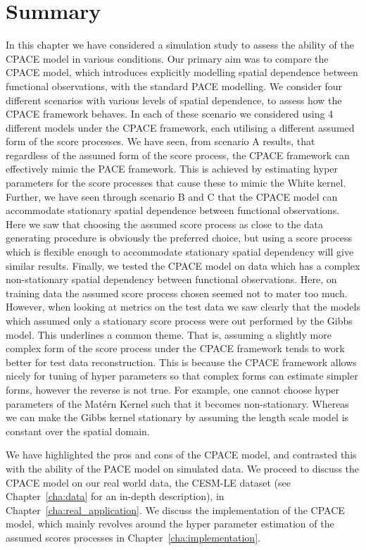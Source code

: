 \section{Summary\label{sec:sim_summ}}
In this chapter we have considered a simulation study to assess the ability of the CPACE model in various conditions.
Our primary aim was to compare the CPACE model, which introduces explicitly modelling spatial dependence between functional observations, with the standard PACE modelling.
We consider four different scenarios with various levels of spatial dependence, to assess how the CPACE framework behaves.
In each of these scenario we considered using 4 different models under the CPACE framework, each utilising a different assumed form of the score processes.
We have seen, from scenario A results, that regardless of the assumed form of the score process, the CPACE framework can effectively mimic the PACE framework.
This is achieved by estimating hyper parameters for the score processes that cause these to mimic the White kernel. 
Further, we have seen through scenario B and C that the CPACE model can accommodate stationary spatial dependence between functional observations.
Here we saw that choosing the assumed score process as close to the data generating procedure is obviously the preferred choice, but using a score process which is flexible enough to accommodate  stationary spatial dependency will give similar results.
Finally, we tested the CPACE model on data which has a complex non-stationary spatial dependency between functional observations.
Here, on training data the assumed score process chosen seemed not to mater too much. 
However, when looking at metrics on the test data we saw clearly that the models which assumed only a stationary score process were out performed by the Gibbs model.
This underlines a common theme. That is, assuming a slightly more complex form of the score process under the CPACE framework tends to work better for test data reconstruction.
This is because the CPACE framework allows nicely for tuning of hyper parameters so that complex forms can estimate simpler forms, however the reverse is not true. 
For example, one cannot choose hyper parameters of the Mat\'ern Kernel such that it becomes non-stationary.
Whereas we can make the Gibbs kernel stationary by assuming the length scale model is constant over the spatial domain. 

We have highlighted the pros and cons of the CPACE model, and contrasted this with the ability of the PACE model on simulated data.
We proceed to discuss the CPACE model on our real world data, the CESM-LE dataset (see Chapter~\ref{cha:data} for an in-depth description), in Chapter~\ref{cha:real_application}.
We discuss the implementation of the CPACE model, which mainly revolves around the hyper parameter estimation of the assumed scores processes in Chapter~\ref{cha:implementation}.



